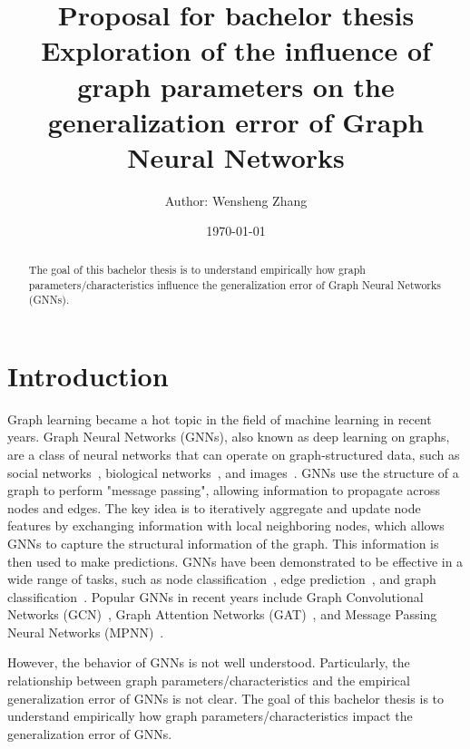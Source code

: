 \documentclass{article}
\title{\textbf{Proposal for bachelor thesis}\\
Exploration of the influence of graph parameters on the generalization error of Graph Neural Networks}
\author{Author: Wensheng Zhang}
\date{\today}
\begin{document}
 

\maketitle



\begin{abstract}
The goal of this bachelor thesis is to understand empirically how graph parameters/characteristics influence the generalization error of Graph Neural Networks (GNNs).
\end{abstract}


\section{Introduction}\label{sec:intro}

Graph learning became a hot topic in the field of machine learning in recent years. Graph Neural Networks (GNNs), also known as deep learning on graphs, are a class of neural networks that can operate on graph-structured data, such as social networks~\cite{easley2010networks}, biological networks~\cite{barabasi2004network}, and images~\cite{simonovsky2017dynamic}. GNNs use the structure of a graph to perform "message passing", allowing information to propagate across nodes and edges. The key idea is to iteratively aggregate and update node features by exchanging information with local neighboring nodes, which allows GNNs to capture the structural information of the graph. This information is then used to make predictions. GNNs have been demonstrated to be effective in a wide range of tasks, such as node classification~\cite{hamilton2017inductive}, edge prediction~\cite{morselli2021network}, and graph classification~\cite{gilmer2017neural}. Popular GNNs in recent years include Graph Convolutional Networks (GCN)~\cite{kipf2016semi}, Graph Attention Networks (GAT)~\cite{velickovic2020pointer}, and Message Passing Neural Networks (MPNN)~\cite{gilmer2017neural}.  

However, the behavior of GNNs is not well understood. Particularly, the relationship between graph parameters/characteristics and the empirical generalization error of GNNs is not clear.  The goal of this bachelor thesis is to understand empirically how graph parameters/characteristics impact the generalization error of GNNs. 
\end{document}
